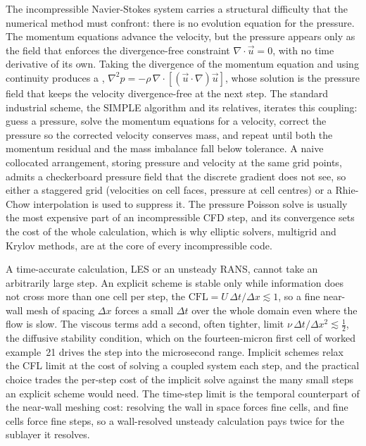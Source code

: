  The incompressible
Navier-Stokes system carries a structural difficulty that the numerical
method must confront: there is no evolution equation for the pressure.
The momentum equations advance the velocity, but the pressure appears
only as the field that enforces the divergence-free constraint
$\nabla\cdot\vec u = 0$, with no time derivative of its own. Taking the
divergence of the momentum equation and using continuity produces a
, $\nabla^2 p = -\rho\,\nabla\cdot
[(\vec u\cdot\nabla)\vec u]$, whose solution is the pressure field that
keeps the velocity divergence-free at the next step. The standard
industrial scheme, the SIMPLE algorithm and its relatives, iterates
this coupling: guess a pressure, solve the momentum equations for a
velocity, correct the pressure so the corrected velocity conserves
mass, and repeat until both the momentum residual and the mass
imbalance fall below tolerance. A naive collocated arrangement, storing
pressure and velocity at the same grid points, admits a
checkerboard pressure field that the discrete gradient does not see, so
either a staggered grid (velocities on cell faces, pressure at cell
centres) or a Rhie-Chow interpolation is used to suppress it. The
pressure Poisson solve is usually the most expensive part of an
incompressible CFD step, and its convergence sets the cost of the whole
calculation, which is why elliptic solvers, multigrid and Krylov
methods, are at the core of every incompressible code.

 A time-accurate calculation, LES or an
unsteady RANS, cannot take an arbitrarily large step. An explicit
scheme is stable only while information does not cross more than one
cell per step, the 
$\text{CFL} = U\,\Delta t/\Delta x \lesssim 1$, so a fine near-wall
mesh of spacing $\Delta x$ forces a small $\Delta t$ over the whole
domain even where the flow is slow. The viscous terms add a second,
often tighter, limit $\nu\,\Delta t/\Delta x^2 \lesssim \tfrac12$, the
diffusive stability condition, which on the fourteen-micron first cell
of worked example~21 drives the step into the microsecond range.
Implicit schemes relax the CFL limit at the cost of solving a coupled
system each step, and the practical choice trades the per-step cost of
the implicit solve against the many small steps an explicit scheme
would need. The time-step limit is the temporal counterpart of the
near-wall meshing cost: resolving the wall in space forces fine cells,
and fine cells force fine steps, so a wall-resolved unsteady
calculation pays twice for the sublayer it resolves.

